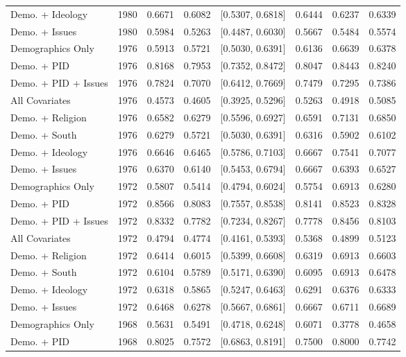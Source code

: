 \begin{longtable}{lrrrlrrr}
  Demo. + Ideology & 1980 & 0.6671 & 0.6082 & [0.5307, 0.6818] & 0.6444 & 0.6237 & 0.6339 \\ 
  Demo. + Issues & 1980 & 0.5984 & 0.5263 & [0.4487, 0.6030] & 0.5667 & 0.5484 & 0.5574 \\ 
  Demographics Only & 1976 & 0.5913 & 0.5721 & [0.5030, 0.6391] & 0.6136 & 0.6639 & 0.6378 \\ 
  Demo. + PID & 1976 & 0.8168 & 0.7953 & [0.7352, 0.8472] & 0.8047 & 0.8443 & 0.8240 \\ 
  Demo. + PID + Issues & 1976 & 0.7824 & 0.7070 & [0.6412, 0.7669] & 0.7479 & 0.7295 & 0.7386 \\ 
  All Covariates & 1976 & 0.4573 & 0.4605 & [0.3925, 0.5296] & 0.5263 & 0.4918 & 0.5085 \\ 
  Demo. + Religion & 1976 & 0.6582 & 0.6279 & [0.5596, 0.6927] & 0.6591 & 0.7131 & 0.6850 \\ 
  Demo. + South & 1976 & 0.6279 & 0.5721 & [0.5030, 0.6391] & 0.6316 & 0.5902 & 0.6102 \\ 
  Demo. + Ideology & 1976 & 0.6646 & 0.6465 & [0.5786, 0.7103] & 0.6667 & 0.7541 & 0.7077 \\ 
  Demo. + Issues & 1976 & 0.6370 & 0.6140 & [0.5453, 0.6794] & 0.6667 & 0.6393 & 0.6527 \\ 
  Demographics Only & 1972 & 0.5807 & 0.5414 & [0.4794, 0.6024] & 0.5754 & 0.6913 & 0.6280 \\ 
  Demo. + PID & 1972 & 0.8566 & 0.8083 & [0.7557, 0.8538] & 0.8141 & 0.8523 & 0.8328 \\ 
  Demo. + PID + Issues & 1972 & 0.8332 & 0.7782 & [0.7234, 0.8267] & 0.7778 & 0.8456 & 0.8103 \\ 
  All Covariates & 1972 & 0.4794 & 0.4774 & [0.4161, 0.5393] & 0.5368 & 0.4899 & 0.5123 \\ 
  Demo. + Religion & 1972 & 0.6414 & 0.6015 & [0.5399, 0.6608] & 0.6319 & 0.6913 & 0.6603 \\ 
  Demo. + South & 1972 & 0.6104 & 0.5789 & [0.5171, 0.6390] & 0.6095 & 0.6913 & 0.6478 \\ 
  Demo. + Ideology & 1972 & 0.6318 & 0.5865 & [0.5247, 0.6463] & 0.6291 & 0.6376 & 0.6333 \\ 
  Demo. + Issues & 1972 & 0.6468 & 0.6278 & [0.5667, 0.6861] & 0.6667 & 0.6711 & 0.6689 \\ 
  Demographics Only & 1968 & 0.5631 & 0.5491 & [0.4718, 0.6248] & 0.6071 & 0.3778 & 0.4658 \\ 
  Demo. + PID & 1968 & 0.8025 & 0.7572 & [0.6863, 0.8191] & 0.7500 & 0.8000 & 0.7742 \\ 

\end{longtable}
